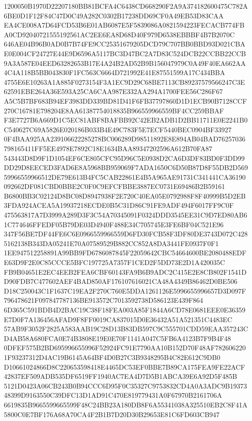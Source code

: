 \documentclass[UTF8,fontset=fandol,zihao=-4,a4paper]{ctexart}
\begin{document}
{{1200050B1970D22207180BB81BCFA4C6438CD668290F2A9A374182600475C782A6BE0D1F12F84C47D0C49A282C0302B17238DD69CF0A49EB53D83CAA
EA4CE008A7D64FCD53B6E01AB6087E5F5839086A0821594223FECACB774FBA0CD92040721555192561AC2EE6EA8D68D40F979D6538EBBBF4B7B2070C
646AE04B96B0AD0B7B74FE9CC25351679205DCD79C707BB0BBD93D021CBAE0E004CF24727E44E9D6596A5117BC3D47BC2A7D83C524DCB22CCBB22CCB
9A3A587E04EED63282653B17E4A24B2AD52B9B156047979C0A49F40EA662AA4C4A118B5BB043830F1FC563C6664D721992E41E87551599A17C434BBA
4755E6E10263A1A885F0273154F3A1EC9D29C68BE7113CB89237579566247C3E62591EBE264A36E593A25CA6CAA987E332AA294A1700FEE56C286F67
A5C5B7BF683B94EF3983DD339BD81D41F6FB37797860D1D1ECB90B7128CCF270C16781E798204E8AA61387754018835B966559966559BF4CC259BBAF
F3E7727B6A669D1C5EC81ABF8BAFBB92C42EB2ADB1D2BB11711E0E2241B0C540627C69A5826E020186B033B4E49C783F5E7ECF5440BEC0904BF33927
0F4BAA925AA239106622285278BC006289D98511892E8E894AB04BAD76257036798165411FF5EE4978E7892C18E1634BAA89347202596A612B70FA87
543443D8D9F1D1054EF6CE805CFC95D96C5E0938D2CA6D3DF83BD0F3DD99DD29D8EECED3FAD6E8A5968BB959069F7ADA1650C6D50B87D8F55DB2D569
59966559966512DE79E613B4FC5CAB22861E4B5A965AE91731C341441CA36190092662DF081CBD0BBE2C0F0C9EFCFBBE3887EC0731E69486B2B59161
B6800BB3C02124D8BC08D8947938F2E720C40EA05E0792988F8F40999B5D2EB3FDA924ACEA5A19937218ECDE0B5C31D86C91FE9ADF494F6017FF9C0F
475563817A7D3999A289D3F3C54A70345091F0324DDD3545EE31C9D7ED80AB61C774646FFEDF05B79DE03D4940F488E34C705745E3FE6BF04C521E96
347F56BE7DF44FE6C6E0966559966559D6FD30FCB58F3DF80DE3743D072C4285162138B343DA05241E70A07589529B882CC852A8DA3441FE0937F0F1
1EE947512258891A99BB9FD6786087845F22059642CBC54664600BE2080488EDFE63D9F2E0C85CCCE5BFC197725A7357F1CED2F5DD73E2D1A420035C
FB9B04651E2EC4EEB2FEA6CBF60143FA9B6B9ADC2C415E2E8CB802F1541DD90FDB7C477602AEF4BAD850AF176107616021CA48A4349B86462D0BE506
D18C250043C1F1637C19EA2F270C760E5DDA1261126E5996655996657D3D097F796478621F097847787136BE913572C7013592738D586123E439F864
6D365C591BDB4D2BAC19C38F18FEA003A85F1844A6CD78E0681EEE0E36359E7D0F7A136456AFAD9F8FF0019CA837015D0E36432A51A521351C4483EC
57AB9F3052F2825A583AAB19C28D13B83DB597C9C555701CDD59EAA357243CD4AB58A680FCA0E74B3808E19E0E70F1141A047C5FB6A4123B7F9B4F48
0DFEF575B2BD695996655996F52924FC91E7790AA10B152D70F48AF7826062201F93237312D4AC19B6145A64BF4D0B27C3B9348295B4C82E612C9DB0
D10661024866D8C220653598418E4465DC53EF0BBE7B89CA175FEA9FE22ACF42837EF509ADB535DF6519FF1940AC7EA4D7D5B1ABCA39E6A92D5F485B
5121D0423A06CB243B0B94CCC6D95F0C35327C9753832CD4A0A3ADC9B1937348399D9163550C39DFC13D1AD91C470E819779431A0F67970B2161706A
6619835B9665599665599F48C24BB23A180DB8F6A55341038A325510EB2C8F41A5800C0E7BF176A68A70CA4F2B1B7D20D30B29653E81C6FD603CB947
}}
\end{document}
